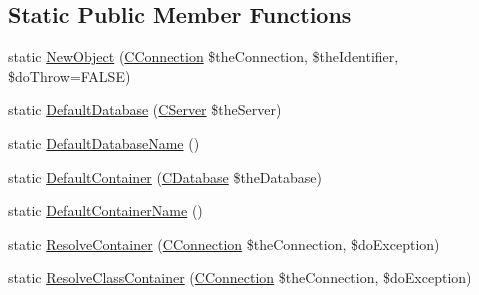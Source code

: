 \subsection*{Static Public Member Functions}
\begin{DoxyCompactItemize}
\item 
static \hyperlink{class_c_persistent_document_afdb58ccaae70ff12ad424fd841f23fe9}{New\-Object} (\hyperlink{class_c_connection}{C\-Connection} \$the\-Connection, \$the\-Identifier, \$do\-Throw=F\-A\-L\-S\-E)
\item 
static \hyperlink{class_c_persistent_document_a6092e640e36485873b70a79db464e0ff}{Default\-Database} (\hyperlink{class_c_server}{C\-Server} \$the\-Server)
\item 
static \hyperlink{class_c_persistent_document_a031b386207e40e4be4e0660de5da1b11}{Default\-Database\-Name} ()
\item 
static \hyperlink{class_c_persistent_document_ada019252d242b5a88a26b82a18e29ed6}{Default\-Container} (\hyperlink{class_c_database}{C\-Database} \$the\-Database)
\item 
static \hyperlink{class_c_persistent_document_ab2fa5e1b0e3f967b8b3727eb28300652}{Default\-Container\-Name} ()
\item 
static \hyperlink{class_c_persistent_document_a4dbe287aa3b46bdc0a1157e001078589}{Resolve\-Container} (\hyperlink{class_c_connection}{C\-Connection} \$the\-Connection, \$do\-Exception)
\item 
static \hyperlink{class_c_persistent_document_ac6a46b4cfed5f22ec63a6436a107ed69}{Resolve\-Class\-Container} (\hyperlink{class_c_connection}{C\-Connection} \$the\-Connection, \$do\-Exception)
\end{DoxyCompactItemize}
